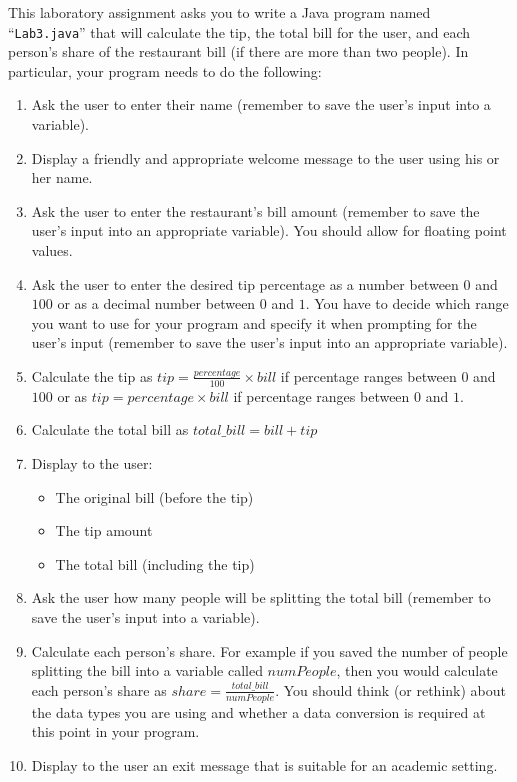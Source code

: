 This laboratory assignment asks you to write a Java program named ``{\tt Lab3.java}'' that will calculate the tip, the
total bill for the user, and each person's share of the restaurant bill (if there are more than two people). In
particular, your program needs to do the following: 
\begin{enumerate}
\item Ask the user to enter their name (remember to save the user's input into a variable).
\item Display a friendly and appropriate welcome message to the user using his or her name. 
\item Ask the user to enter the restaurant's bill amount (remember to save the user's input into an appropriate variable). You should allow for floating point values.
\item Ask the user to enter the desired tip percentage as a number between $0$ and $100$ or as a decimal number between
  $0$ and $1$. You have to decide which range you want to use for your program and specify it when prompting for the user's
  input (remember to save the user's input into an appropriate variable).
\item Calculate the tip as $tip = \frac{percentage}{100} \times bill$ if percentage ranges between $0$ and $100$ or as $tip = percentage \times bill$ if percentage ranges between $0$ and $1$.
\item Calculate the total bill as $total\_bill = bill+tip$
\item Display to the user:
	\begin{itemize}
		\item The original bill (before the tip)
		\item The tip amount
		\item The total bill (including the tip)
	\end{itemize}
\item Ask the user how many people will be splitting the total bill (remember to save the user's input into a variable).
\item Calculate each person's share. For example if you saved the number of people splitting the bill into a variable
  called $numPeople$, then you would calculate each person's share as $share = \frac{total\_bill}{numPeople}$. You
  should think (or rethink) about the data types you are using and whether a data conversion is required at this point
  in your program. 
\item Display to the user an exit message that is suitable for an academic setting.
\end{enumerate}

